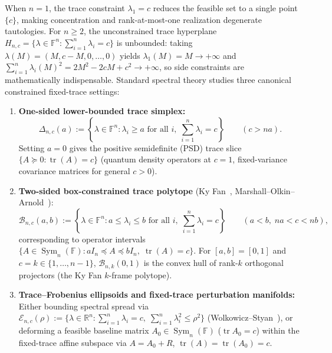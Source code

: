 \documentclass[11pt]{article}
\theoremstyle{definition}
\theoremstyle{remark}
\newcommand{\tr}{\operatorname{tr}}
\newcommand{\Sym}{\operatorname{Sym}}
\begin{document}
When $n = 1$, the trace constraint $\lambda_1 = c$ reduces the feasible set to a single point $\{c\}$, making concentration and rank-at-most-one realization degenerate tautologies. For $n \ge 2$, the unconstrained trace hyperplane $H_{n,c} = \{\lambda \in \mathbb{F}^n : \sum_{i=1}^n \lambda_i = c\}$ is unbounded: taking $\lambda(M) = (M, c - M, 0, \dots, 0)$ yields $\lambda_1(M) = M \to +\infty$ and $\sum_{i=1}^n \lambda_i(M)^2 = 2M^2 - 2cM + c^2 \to +\infty$, so side constraints are mathematically indispensable. Standard spectral theory studies three canonical constrained fixed-trace settings:
\begin{enumerate}
  \item \textbf{One-sided lower-bounded trace simplex:}
    \[
      \Delta_{n,c}(a) := \left\{\lambda \in \mathbb{F}^n : \lambda_i \ge a \text{ for all } i,\; \sum_{i=1}^n \lambda_i = c\right\} \qquad (c > n a).
    \]
    Setting $a = 0$ gives the positive semidefinite (PSD) trace slice $\{A \succeq 0 : \tr(A) = c\}$ (quantum density operators at $c = 1$, fixed-variance covariance matrices for general $c > 0$).
  \item \textbf{Two-sided box-constrained trace polytope} (Ky Fan~\cite{Fan1949}, Marshall--Olkin--Arnold~\cite{MOA2011}):
    \[
      \mathcal{B}_{n,c}(a,b) := \left\{\lambda \in \mathbb{F}^n : a \le \lambda_i \le b \text{ for all } i,\; \sum_{i=1}^n \lambda_i = c\right\} \qquad (a < b,\; n a < c < n b),
    \]
    corresponding to operator intervals $\{A \in \Sym_n(\mathbb{F}) : a I_n \preceq A \preceq b I_n,\; \tr(A) = c\}$. For $[a,b] = [0,1]$ and $c = k \in \{1, \dots, n-1\}$, $\mathcal{B}_{n,k}(0,1)$ is the convex hull of rank-$k$ orthogonal projectors (the Ky Fan $k$-frame polytope).
  \item \textbf{Trace--Frobenius ellipsoids and fixed-trace perturbation manifolds:}
    Either bounding spectral spread via $\mathcal{E}_{n,c}(\rho) := \{\lambda \in \mathbb{R}^n : \sum_{i=1}^n \lambda_i = c,\; \sum_{i=1}^n \lambda_i^2 \le \rho^2\}$ (Wolkowicz--Styan~\cite{WS1980}), or deforming a feasible baseline matrix $A_0 \in \Sym_n(\mathbb{F})$ ($\tr A_0 = c$) within the fixed-trace affine subspace via $A = A_0 + R$, $\tr(A) = \tr(A_0) = c$.
\end{enumerate}
\end{document}

